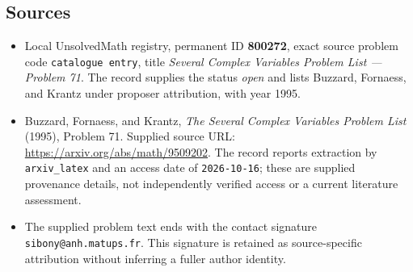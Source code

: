 \documentclass[11pt]{article}
\begin{document}
\subsection{Sources}
\begin{itemize}
\item Local UnsolvedMath registry, permanent ID \textbf{800272}, exact source problem code \texttt{catalogue entry}, title \emph{Several Complex Variables Problem List --- Problem 71}. The record supplies the status \emph{open} and lists Buzzard, Fornaess, and Krantz under proposer attribution, with year 1995.
\item Buzzard, Fornaess, and Krantz, \emph{The Several Complex Variables Problem List} (1995), Problem 71. Supplied source URL: \url{https://arxiv.org/abs/math/9509202}. The record reports extraction by \texttt{arxiv\_latex} and an access date of \texttt{2026-10-16}; these are supplied provenance details, not independently verified access or a current literature assessment.
\item The supplied problem text ends with the contact signature \texttt{sibony@anh.matups.fr}. This signature is retained as source-specific attribution without inferring a fuller author identity.
\end{itemize}
\end{document}
